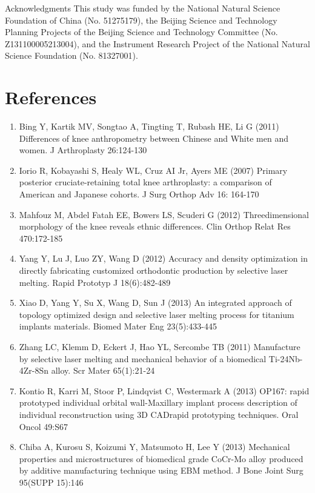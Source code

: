 \documentclass[10pt]{article}
\begin{document}
Acknowledgments This study was funded by the National Natural Science Foundation of China (No. 51275179), the Beijing Science and Technology Planning Projects of the Beijing Science and Technology Committee (No. Z131100005213004), and the Instrument Research Project of the National Natural Science Foundation (No. 81327001).

\section*{References}
\begin{enumerate}
  \item Bing Y, Kartik MV, Songtao A, Tingting T, Rubash HE, Li G (2011) Differences of knee anthropometry between Chinese and White men and women. J Arthroplasty 26:124-130

  \item Iorio R, Kobayashi S, Healy WL, Cruz AI Jr, Ayers ME (2007) Primary posterior cruciate-retaining total knee arthroplasty: a comparison of American and Japanese cohorts. J Surg Orthop Adv 16: 164-170

  \item Mahfouz M, Abdel Fatah EE, Bowers LS, Scuderi G (2012) Threedimensional morphology of the knee reveals ethnic differences. Clin Orthop Relat Res 470:172-185

  \item Yang Y, Lu J, Luo ZY, Wang D (2012) Accuracy and density optimization in directly fabricating customized orthodontic production by selective laser melting. Rapid Prototyp J 18(6):482-489

  \item Xiao D, Yang Y, Su X, Wang D, Sun J (2013) An integrated approach of topology optimized design and selective laser melting process for titanium implants materials. Biomed Mater Eng 23(5):433-445

  \item Zhang LC, Klemm D, Eckert J, Hao YL, Sercombe TB (2011) Manufacture by selective laser melting and mechanical behavior of a biomedical Ti-24Nb-4Zr-8Sn alloy. Scr Mater 65(1):21-24

  \item Kontio R, Karri M, Stoor P, Lindqvist C, Westermark A (2013) OP167: rapid prototyped individual orbital wall-Maxillary implant process description of individual reconstruction using $3 \mathrm{D}$ CADrapid prototyping techniques. Oral Oncol 49:S67

  \item Chiba A, Kurosu S, Koizumi Y, Matsumoto H, Lee Y (2013) Mechanical properties and microstructures of biomedical grade Co$\mathrm{Cr}$-Mo alloy produced by additive manufacturing technique using EBM method. J Bone Joint Surg 95(SUPP 15):146


\end{enumerate}
\end{document}
